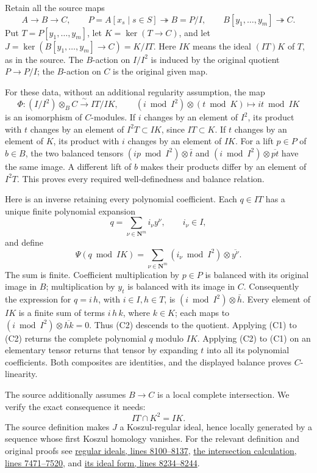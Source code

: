 Retain all the source maps \[
 A\longrightarrow B\longrightarrow C,\qquad
 P=A[x_s\mid s\in S]\twoheadrightarrow B=P/I,\qquad
 B[y_1,\ldots,y_m]\twoheadrightarrow C.
\] Put \(T=P[y_1,\ldots,y_m]\), let \(K=\ker(T\to C)\), and let \(J=\ker(B[y_1,\ldots,y_m]\to C)=K/IT\). Here \(IK\) means the ideal \((IT)K\) of \(T\), as in the source. The \(B\)-action on \(I/I^2\) is induced by the original quotient \(P\to P/I\); the \(B\)-action on \(C\) is the original given map.

For these data, without an additional regularity assumption, the map \[
 \Phi:(I/I^2)\otimes_B C\xrightarrow{\ \sim\ }IT/IK,
 \qquad (i\bmod I^2)\otimes(t\bmod K)\longmapsto it\bmod IK
\tag{C1}
\] is an isomorphism of \(C\)-modules. If \(i\) changes by an element of \(I^2\), its product with \(t\) changes by an element of \(I^2T\subset IK\), since \(IT\subset K\). If \(t\) changes by an element of \(K\), its product with \(i\) changes by an element of \(IK\). For a lift \(p\in P\) of \(b\in B\), the two balanced tensors \((ip\bmod I^2)\otimes\bar t\) and \((i\bmod I^2)\otimes\overline{pt}\) have the same image. A different lift of \(b\) makes their products differ by an element of \(I^2T\). This proves every required well-definedness and balance relation.

Here is an inverse retaining every polynomial coefficient. Each \(q\in IT\) has a unique finite polynomial expansion \[
 q=\sum_{\nu\in\mathbf N^m}i_\nu y^\nu,\qquad i_\nu\in I,
\] and define \[
 \Psi(q\bmod IK)=
 \sum_{\nu\in\mathbf N^m}(i_\nu\bmod I^2)\otimes\overline{y^\nu}.
\tag{C2}
\] The sum is finite. Coefficient multiplication by \(p\in P\) is balanced with its original image in \(B\); multiplication by \(y_t\) is balanced with its image in \(C\). Consequently the expression for \(q=i\,h\), with \(i\in I,h\in T\), is \((i\bmod I^2)\otimes\bar h\). Every element of \(IK\) is a finite sum of terms \(i\,h\,k\), where \(k\in K\); each maps to \((i\bmod I^2)\otimes\overline{hk}=0\). Thus (C2) descends to the quotient. Applying (C1) to (C2) returns the complete polynomial \(q\) modulo \(IK\). Applying (C2) to (C1) on an elementary tensor returns that tensor by expanding \(t\) into all its polynomial coefficients. Both composites are identities, and the displayed balance proves \(C\)-linearity.

The source additionally assumes \(B\to C\) is a local complete intersection. We verify the exact consequence it needs: \[
 IT\cap K^2=IK.
\tag{C3}
\] The source definition makes \(J\) a Koszul-regular ideal, hence locally generated by a sequence whose first Koszul homology vanishes. For the relevant definition and original proofs see \href{https://github.com/stacks/stacks-project/blob/a04446e57ec1fbc252a871afcec7752fb2807b14/more-algebra.tex\#L8100}{regular ideals, lines 8100--8137}, \href{https://github.com/stacks/stacks-project/blob/a04446e57ec1fbc252a871afcec7752fb2807b14/more-algebra.tex\#L7471}{the intersection calculation, lines 7471--7520}, and \href{https://github.com/stacks/stacks-project/blob/a04446e57ec1fbc252a871afcec7752fb2807b14/more-algebra.tex\#L8234}{its ideal form, lines 8234--8244}.

